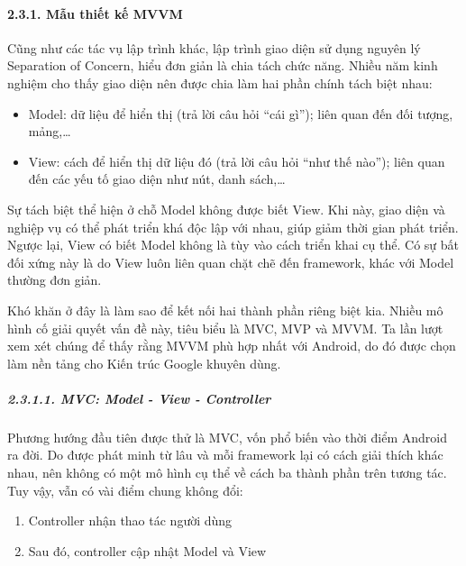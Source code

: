 \documentclass[
]{article}
\begin{document}
\hypertarget{mux1eabu-thiux1ebft-kux1ebf-mvvm}{%
\paragraph{\texorpdfstring{2.3.1. Mẫu thiết kế MVVM
}{2.3.1. Mẫu thiết kế MVVM }}\label{mux1eabu-thiux1ebft-kux1ebf-mvvm}}

Cũng như các tác vụ lập trình khác, lập trình giao diện sử dụng nguyên
lý Separation of Concern, hiểu đơn giản là chia tách chức năng. Nhiều
năm kinh nghiệm cho thấy giao diện nên được chia làm hai phần chính tách
biệt nhau:

\begin{itemize}
\item
  Model: dữ liệu để hiển thị (trả lời câu hỏi ``cái gì''); liên quan đến
  đối tượng, mảng,\ldots{}
\item
  View: cách để hiển thị dữ liệu đó (trả lời câu hỏi ``như thế nào'');
  liên quan đến các yếu tố giao diện như nút, danh sách,\ldots{}
\end{itemize}

Sự tách biệt thể hiện ở chỗ Model không được biết View. Khi này, giao
diện và nghiệp vụ có thể phát triển khá độc lập với nhau, giúp giảm thời
gian phát triển. Ngược lại, View có biết Model không là tùy vào cách
triển khai cụ thể. Có sự bất đối xứng này là do View luôn liên quan chặt
chẽ đến framework, khác với Model thường đơn giản.

Khó khăn ở đây là làm sao để kết nối hai thành phần riêng biệt kia.
Nhiều mô hình cố giải quyết vấn đề này, tiêu biểu là MVC, MVP và MVVM.
Ta lần lượt xem xét chúng để thấy rằng MVVM phù hợp nhất với Android, do
đó được chọn làm nền tảng cho Kiến trúc Google khuyên dùng.

\hypertarget{mvc-model---view---controller}{%
\subparagraph{2.3.1.1. MVC: Model - View -
Controller}\label{mvc-model---view---controller}}

Phương hướng đầu tiên được thử là MVC, vốn phổ biến vào thời điểm
Android ra đời. Do được phát minh từ lâu và mỗi framework lại có cách
giải thích khác nhau, nên không có một mô hình cụ thể về cách ba thành
phần trên tương tác. Tuy vậy, vẫn có vài điểm chung không đổi:

\begin{enumerate}
\def\labelenumi{\arabic{enumi}.}
\item
  Controller nhận thao tác người dùng
\item
  Sau đó, controller cập nhật Model và View
\end{enumerate}
\end{document}
